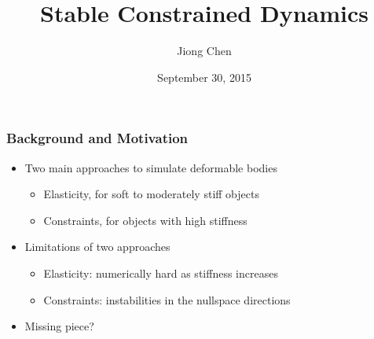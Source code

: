 \documentclass[serif,mathserif]{beamer}
\author[Jiong Chen]{Jiong Chen}
\title[\hspace{2em}\insertframenumber/\inserttotalframenumber]{Stable Constrained Dynamics}
\date{September 30, 2015} %
\begin{document}
\maketitle

\begin{frame}
 \frametitle{Background and Motivation}
 \begin{itemize}
  \item Two main approaches to simulate deformable bodies
    \begin{itemize}
     \item \color{red}Elasticity, for soft to moderately stiff objects
     \item \color{green}Constraints, for objects with high stiffness
    \end{itemize}
  \item Limitations of two approaches
    \begin{itemize}
      \item \color{red} Elasticity: numerically hard as stiffness increases
      \item \color{green} Constraints: instabilities in the nullspace directions
    \end{itemize}
  \item Missing piece?
  \pause
 \end{itemize}

\end{frame}
\end{document}
